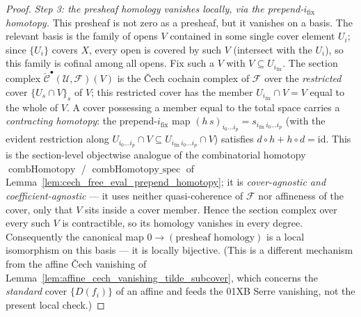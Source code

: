 \begin{proof}
  \emph{Step 3: the presheaf homology vanishes locally, via the prepend-\(i_{\mathrm{fix}}\) homotopy.}
  This presheaf is not zero as a presheaf, but it vanishes on a basis. The relevant basis is the family
  of opens \(V\) contained in some single cover element \(U_i\); since \(\{U_i\}\) covers \(X\), every
  open is covered by such \(V\) (intersect with the \(U_i\)), so this family is cofinal among all opens.
  Fix such a \(V\) with \(V \subseteq U_{i_{\mathrm{fix}}}\). The section complex
  \(\check{\mathcal{C}}^\bullet(\mathcal{U}, \mathcal{F})(V)\) is the {\v C}ech cochain complex of
  \(\mathcal{F}\) over the \emph{restricted} cover \(\{U_s \cap V\}_s\) of \(V\); this restricted cover
  has the member \(U_{i_{\mathrm{fix}}} \cap V = V\) equal to the whole of \(V\). A cover possessing a
  member equal to the total space carries a \emph{contracting homotopy}: the prepend-\(i_{\mathrm{fix}}\)
  map \((h\,s)_{i_0 \ldots i_p} = s_{i_{\mathrm{fix}}\, i_0 \ldots i_p}\) (with the evident
  restriction along \(U_{i_0 \ldots i_p} \cap V \subseteq U_{i_{\mathrm{fix}}\, i_0 \ldots i_p} \cap V\))
  satisfies \(d \circ h + h \circ d = \mathrm{id}\). This is the section-level objectwise analogue of the
  combinatorial homotopy \(\operatorname{combHomotopy}\) /
  \(\operatorname{combHomotopy\_spec}\) of Lemma~\ref{lem:cech_free_eval_prepend_homotopy}; it is
  \emph{cover-agnostic and coefficient-agnostic} --- it uses neither quasi-coherence of \(\mathcal{F}\)
  nor affineness of the cover, only that \(V\) sits inside a cover member. Hence the section complex over
  every such \(V\) is contractible, so its homology vanishes in every degree. Consequently the canonical
  map \(0 \to (\text{presheaf homology})\) is a local isomorphism on this basis --- it is locally
  bijective. (This is a different mechanism from the affine {\v C}ech vanishing of
  Lemma~\ref{lem:affine_cech_vanishing_tilde_subcover}, which concerns the \emph{standard} cover
  \(\{D(f_i)\}\) of an affine and feeds the 01XB Serre vanishing, not the present local check.)


\end{proof}
